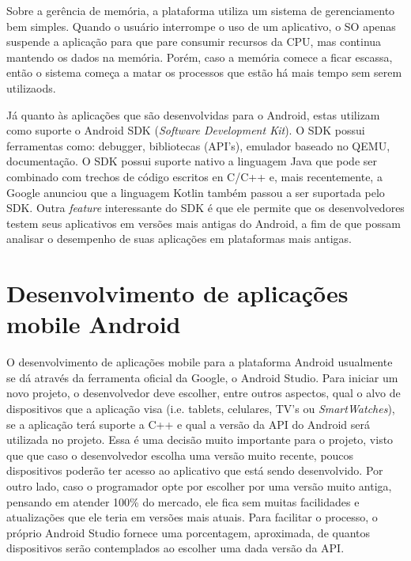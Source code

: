 \documentclass[
    12pt,       %
    openright,      %
    twoside,      %
    a4paper,      %
    english,      %
    french,       %
    spanish,      %
    brazil,       %
    ]{abntex2}
\begin{document}
        Sobre a gerência de memória, a plataforma utiliza um sistema de gerenciamento bem simples.
        Quando o usuário interrompe o uso de um aplicativo, o SO apenas suspende a aplicação para
        que pare consumir recursos da CPU, mas continua mantendo os dados na memória. Porém, caso
        a memória comece a ficar escassa, então o sistema começa a matar os processos que estão
        há mais tempo sem serem utilizaods.

        Já quanto às aplicações que são desenvolvidas para o Android, estas utilizam como suporte
        o Android SDK (\textit{Software Development Kit}). O SDK possui ferramentas como: debugger,
        bibliotecas (API's), emulador baseado no QEMU, documentação. O SDK possui suporte nativo
        a linguagem Java que pode ser combinado com trechos de código escritos en C/C++ e,
        mais recentemente, a Google anunciou que a linguagem Kotlin também passou a ser suportada
        pelo SDK. Outra \textit{feature} interessante do SDK é que ele permite que os
        desenvolvedores testem seus aplicativos em versões mais antigas do Android, a fim de
        que possam analisar o desempenho de suas aplicações em plataformas mais antigas.

      \section{Desenvolvimento de aplicações mobile Android}
        O desenvolvimento de aplicações mobile para a plataforma Android usualmente se dá através
        da ferramenta oficial da Google, o Android Studio. Para iniciar um novo projeto, o
        desenvolvedor deve escolher, entre outros aspectos, qual o alvo de dispositivos que a
        aplicação visa (i.e. tablets, celulares, TV's ou \textit{SmartWatches}), se a aplicação
        terá suporte a C++ e qual a versão da API do Android será utilizada no projeto. Essa é
        uma decisão muito importante para o projeto, visto que que caso o desenvolvedor escolha
        uma versão muito recente, poucos dispositivos poderão ter acesso ao aplicativo que está
        sendo desenvolvido. Por outro lado, caso o programador opte por escolher por uma versão
        muito antiga, pensando em atender 100\% do mercado, ele fica sem muitas facilidades e
        atualizações que ele teria em versões mais atuais. Para facilitar o processo, o próprio
        Android Studio fornece uma porcentagem, aproximada, de quantos dispositivos serão contemplados
        ao escolher uma dada versão da API.
\end{document}
